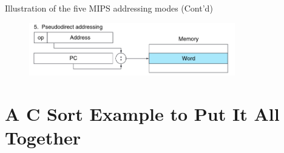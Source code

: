 \begin{frame}{Illustration of the five MIPS addressing modes (Cont'd)}
\begin{figure}
\begin{center}
\includegraphics[width=0.8\textwidth, height=0.4\textheight]{docs/images/addr-5}
\end{center}
\end{figure}
\end{frame}

\section{A C Sort Example to Put It All Together}
